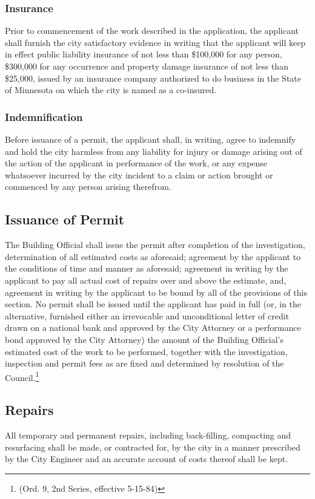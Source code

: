 \subsubsection{Insurance}
Prior to commencement of the work described in the application, the applicant shall furnish the city satisfactory evidence in writing that the applicant will keep in effect public liability insurance of not less than \$100,000 for any person, \$300,000 for any occurrence and property damage insurance of not less than \$25,000, issued by an insurance company authorized to do business in the State of Minnesota on which the city is named as a co-insured.
\subsubsection{Indemnification}
Before issuance of a permit, the applicant shall, in writing, agree to indemnify and hold the city harmless from any liability for injury or damage arising out of the action of the applicant in performance of the work, or any expense whatsoever incurred by the city incident to a claim or action brought or commenced by any person arising therefrom.
\subsection{Issuance of Permit}
The Building Official shall issue the permit after completion of the investigation, determination of all estimated costs as aforesaid; agreement by the applicant to the conditions of time and manner as aforesaid; agreement in writing by the applicant to pay all actual cost of repairs over and above the estimate, and, agreement in writing by the applicant to be bound by all of the provisions of this section.  No permit shall be issued until the applicant has paid in full (or, in the alternative, furnished either an irrevocable and unconditional letter of credit drawn on a national bank and approved by the City Attorney or a performance bond approved by the City Attorney) the amount of the Building Official’s estimated cost of the work to be performed, together with the investigation, inspection and permit fees as are fixed and determined by resolution of the Council.\footnote{(Ord. 9, 2nd Series, effective 5-15-84)}
\subsection{Repairs}
All temporary and permanent repairs, including back-filling, compacting and resurfacing shall be made, or contracted for, by the city in a manner prescribed by the City Engineer and an accurate account of costs thereof shall be kept.
